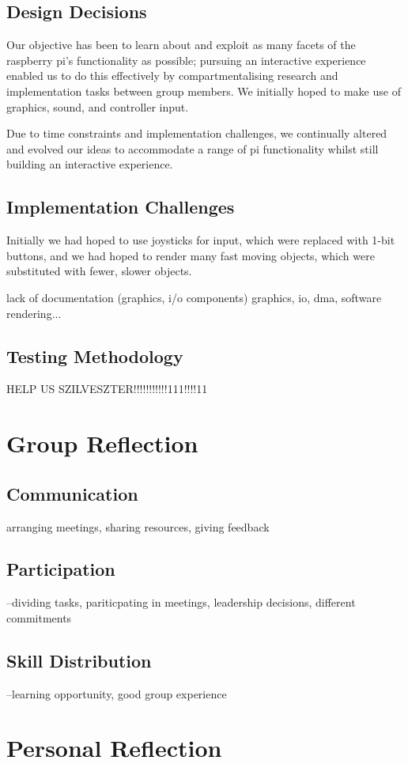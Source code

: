 \documentclass[11pt]{article}
\begin{document}
\subsection{Design Decisions}
Our objective has been to learn about and exploit as many facets of the 
raspberry pi's functionality as possible; pursuing an interactive experience 
enabled us to do this effectively by compartmentalising research and 
implementation tasks between group members. We initially hoped to make use 
of graphics, sound, and controller input.

Due to time constraints and implementation challenges, we continually altered 
and evolved our ideas to accommodate a range of pi functionality whilst still 
building an interactive experience.
\subsection{Implementation Challenges}
Initially we had hoped to use joysticks for input, which were replaced with 
1-bit buttons, and we had hoped to render many fast moving objects, which were 
substituted with fewer, slower objects.

lack of documentation (graphics, i/o components)
graphics, io, dma, software rendering... 
\subsection{Testing Methodology}
HELP US SZILVESZTER!!!!!!!!!!!111!!!!11
\section{Group Reflection}
\subsection{Communication}
arranging meetings, sharing resources, giving feedback
\subsection{Participation}
--dividing tasks, pariticpating in meetings, leadership decisions, different commitments 

\subsection{Skill Distribution}
--learning opportunity, good group experience

\section{Personal Reflection}
\end{document}
